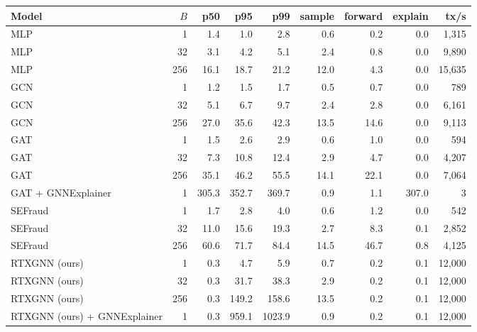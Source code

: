 \begin{tabular}{lrrrrrrrr}
\toprule
Model & $B$ & p50 & p95 & p99 & sample & forward & explain & tx/s\\
\midrule
MLP & 1 & 1.4 & 1.0 & 2.8 & 0.6 & 0.2 & 0.0 & 1,315\\
MLP & 32 & 3.1 & 4.2 & 5.1 & 2.4 & 0.8 & 0.0 & 9,890\\
MLP & 256 & 16.1 & 18.7 & 21.2 & 12.0 & 4.3 & 0.0 & 15,635\\
GCN & 1 & 1.2 & 1.5 & 1.7 & 0.5 & 0.7 & 0.0 & 789\\
GCN & 32 & 5.1 & 6.7 & 9.7 & 2.4 & 2.8 & 0.0 & 6,161\\
GCN & 256 & 27.0 & 35.6 & 42.3 & 13.5 & 14.6 & 0.0 & 9,113\\
GAT & 1 & 1.5 & 2.6 & 2.9 & 0.6 & 1.0 & 0.0 & 594\\
GAT & 32 & 7.3 & 10.8 & 12.4 & 2.9 & 4.7 & 0.0 & 4,207\\
GAT & 256 & 35.1 & 46.2 & 55.5 & 14.1 & 22.1 & 0.0 & 7,064\\
GAT + GNNExplainer & 1 & 305.3 & 352.7 & 369.7 & 0.9 & 1.1 & 307.0 & 3\\
SEFraud & 1 & 1.7 & 2.8 & 4.0 & 0.6 & 1.2 & 0.0 & 542\\
SEFraud & 32 & 11.0 & 15.6 & 19.3 & 2.7 & 8.3 & 0.1 & 2,852\\
SEFraud & 256 & 60.6 & 71.7 & 84.4 & 14.5 & 46.7 & 0.8 & 4,125\\
RTXGNN (ours) & 1 & 0.3 & 4.7 & 5.9 & 0.7 & 0.2 & 0.1 & 12,000\\
RTXGNN (ours) & 32 & 0.3 & 31.7 & 38.3 & 2.9 & 0.2 & 0.1 & 12,000\\
RTXGNN (ours) & 256 & 0.3 & 149.2 & 158.6 & 13.5 & 0.2 & 0.1 & 12,000\\
RTXGNN (ours) + GNNExplainer & 1 & 0.3 & 959.1 & 1023.9 & 0.9 & 0.2 & 0.1 & 12,000\\
\bottomrule
\end{tabular}
